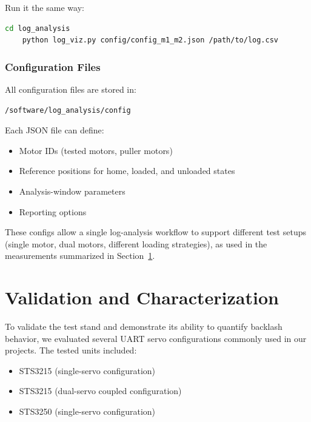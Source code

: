 \documentclass[11pt,letterpaper]{article}
\begin{document}
Run it the same way:

\begin{lstlisting}[language=bash]
    cd log_analysis
    python log_viz.py config/config_m1_m2.json /path/to/log.csv
\end{lstlisting}

\subsubsection{Configuration Files}
\label{subsubsec:config-files}

All configuration files are stored in:

\begin{verbatim}
/software/log_analysis/config
\end{verbatim}

Each JSON file can define:

\begin{itemize}
    \item Motor IDs (tested motors, puller motors)
    \item Reference positions for home, loaded, and unloaded states
    \item Analysis-window parameters
    \item Reporting options
\end{itemize}

These configs allow a single log-analysis workflow to support different test setups (single motor, dual motors, different loading strategies), as used in the measurements summarized in Section~\ref{sec:validation}.

\section{Validation and Characterization}
\label{sec:validation}

To validate the test stand and demonstrate its ability to quantify backlash behavior, we evaluated several UART servo configurations commonly used in our projects. The tested units included:

\begin{itemize}
    \item STS3215 (single-servo configuration)
    \item STS3215 (dual-servo coupled configuration)
    \item STS3250 (single-servo configuration)
\end{itemize}
\end{document}
